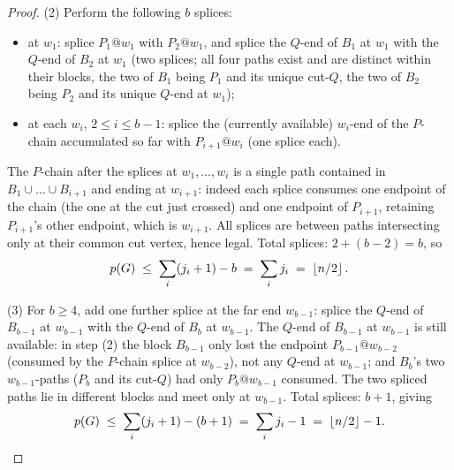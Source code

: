 \begin{proof}
(2) Perform the following $b$ splices:
\begin{itemize}[leftmargin=1.5em]
\item at $w_1$: splice $P_1@w_1$ with $P_2@w_1$, and splice the $Q$-end of
$B_1$ at $w_1$ with the $Q$-end of $B_2$ at $w_1$ (two splices; all four
paths exist and are distinct within their blocks, the two of $B_1$ being
$P_1$ and its unique cut-$Q$, the two of $B_2$ being $P_2$ and its unique
$Q$-end at $w_1$);
\item at each $w_i$, $2\le i\le b-1$: splice the (currently available)
$w_i$-end of the $P$-chain accumulated so far with $P_{i+1}@w_i$ (one
splice each).
\end{itemize}
The $P$-chain after the splices at $w_1,\dots,w_i$ is a single path
contained in $B_1\cup\dots\cup B_{i+1}$ and ending at $w_{i+1}$: indeed
each splice consumes one endpoint of the chain (the one at the cut just
crossed) and one endpoint of $P_{i+1}$, retaining $P_{i+1}$'s other
endpoint, which is $w_{i+1}$. All splices are between paths intersecting
only at their common cut vertex, hence legal. Total splices:
$2+(b-2)=b$, so
\[
p(G)\;\le\;\sum_i(j_i+1)-b\;=\;\sum_ij_i\;=\;\left\lfloor n/2 \right\rfloor.
\]

(3) For $b\ge4$, add one further splice at the far end $w_{b-1}$: splice
the $Q$-end of $B_{b-1}$ at $w_{b-1}$ with the $Q$-end of $B_b$ at
$w_{b-1}$. The $Q$-end of $B_{b-1}$ at $w_{b-1}$ is still available: in
step (2) the block $B_{b-1}$ only lost the endpoint $P_{b-1}@w_{b-2}$
(consumed by the $P$-chain splice at $w_{b-2}$), not any $Q$-end at
$w_{b-1}$; and $B_b$'s two $w_{b-1}$-paths ($P_b$ and its cut-$Q$) had
only $P_b@w_{b-1}$ consumed. The two spliced paths lie in different blocks
and meet only at $w_{b-1}$. Total splices: $b+1$, giving
\[
p(G)\;\le\;\sum_i(j_i+1)-(b+1)\;=\;\sum_ij_i-1\;=\;\left\lfloor n/2 \right\rfloor-1. \qedhere
\]
\end{proof}

